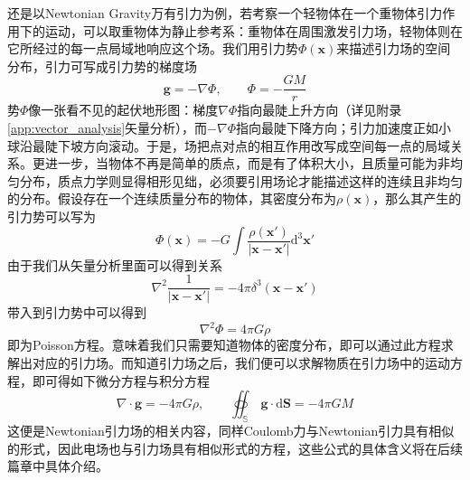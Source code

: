 \documentclass[b5paper]{book}
\begin{document}
还是以Newtonian Gravity万有引力为例，若考察一个轻物体在一个重物体引力作用下的运动，可以取重物体为静止参考系：重物体在周围激发引力场，轻物体则在它所经过的每一点局域地响应这个场。我们用引力势$\Phi(\boldsymbol x)$来描述引力场的空间分布，引力可写成引力势的梯度场
\begin{equation}
    \boldsymbol g = -\nabla \Phi,\qquad \Phi = -\frac{GM}{r}
\end{equation}
势$\Phi$像一张看不见的起伏地形图：梯度$\nabla\Phi$指向最陡上升方向（详见附录\ref{app:vector_analysis}矢量分析），而$-\nabla\Phi$指向最陡下降方向；引力加速度正如小球沿最陡下坡方向滚动。于是，场把点对点的相互作用改写成空间每一点的局域关系。更进一步，当物体不再是简单的质点，而是有了体积大小，且质量可能为非均匀分布，质点力学则显得相形见绌，必须要引用场论才能描述这样的连续且非均匀的分布。假设存在一个连续质量分布的物体，其密度分布为$\rho(\boldsymbol{x})$，那么其产生的引力势可以写为
\begin{equation}
    \Phi(\boldsymbol{x}) = -G\int\frac{\rho(\boldsymbol{x}')}{|\boldsymbol{x}-\boldsymbol{x}'|}\mathrm{d}^3\boldsymbol{x}'
\end{equation}
由于我们从矢量分析里面可以得到关系
\begin{equation}
    \nabla^2\frac{1}{|\boldsymbol{x}-\boldsymbol{x}'|} = -4\pi\delta^3(\boldsymbol{x}-\boldsymbol{x}')
\end{equation}
带入到引力势中可以得到
\begin{equation}
    \nabla^2\Phi = 4\pi G\rho
\end{equation}
即为Poisson方程。意味着我们只需要知道物体的密度分布，即可以通过此方程求解出对应的引力场。而知道引力场之后，我们便可以求解物质在引力场中的运动方程，即可得如下微分方程与积分方程
\begin{equation}
    \nabla\cdot \boldsymbol{g} = -4\pi G \rho,\qquad \oiint_\mathbb{S} ~\boldsymbol{g}\cdot\mathrm{d}\boldsymbol{S} = -4\pi G M
\end{equation}
这便是Newtonian引力场的相关内容，同样Coulomb力与Newtonian引力具有相似的形式，因此电场也与引力场具有相似形式的方程，这些公式的具体含义将在后续篇章中具体介绍。
\end{document}
